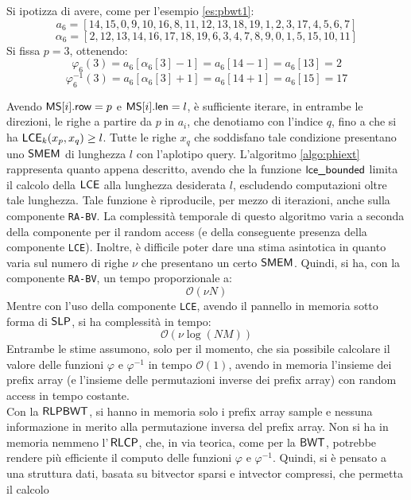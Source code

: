 \begin{esempio}
  Si ipotizza di avere, come per l'esempio \ref{es:pbwt1}:
  \[a_6=[14,15,0,9,10,16,8,11,12,13,18,19,1,2,3,17,4,5,6,7]\]
  \[\alpha_6=[2,12,13,14,16,17,18,19,6,3,4,7,8,9,0,1,5,15,10,11]\]
  Si fissa $p=3$, ottenendo:
  \[\varphi_6(3)=a_6[\alpha_6[3]-1]=a_6[14-1]=a_6[13]=2\]
  \[\varphi^{-1}_6(3)=a_6[\alpha_6[3]+1]=a_6[14+1]=a_6[15]=17\]
\end{esempio}
Avendo $\mbox{\rm {\sf MS}}[i].\mbox{\rm {\sf row}}=p$ e $\mbox{\rm {\sf MS}}[i].\mbox{\rm {\sf len}}=l$, è sufficiente iterare, in entrambe le
direzioni, le righe a
partire da 
$p$ in $a_i$, che denotiamo con l'indice $q$, fino a che si ha 
$\mbox{\rm {\sf LCE}}_k(x_p, x_q)\geq l$.
Tutte le righe $x_q$ che soddisfano tale condizione presentano uno
$\mbox{\rm {\sf SMEM}}$ di lunghezza $l$ con 
l'aplotipo query. L'algoritmo \ref{algo:phiext} rappresenta quanto
appena descritto, avendo che la funzione $\mbox{\rm {\sf lce\_bounded}}$ limita il calcolo
della 
$\mbox{\rm {\sf LCE}}$ alla lunghezza desiderata $l$, escludendo computazioni oltre tale
lunghezza. Tale funzione è riproducile, per mezzo di iterazioni, anche sulla
componente \texttt{RA-BV}. La complessità temporale di questo algoritmo
varia a seconda della componente per il random access (e della conseguente
presenza della 
componente \texttt{LCE}). Inoltre, è difficile poter dare una stima asintotica
in quanto varia sul numero di righe $\nu$ che presentano un certo
$\mbox{\rm {\sf SMEM}}$. Quindi, si ha, con la 
componente \texttt{RA-BV}, un tempo proporzionale a:
\begin{equation}
  \label{eq:phiaccbv}
  \mathcal{O}(\nu N)
\end{equation}
Mentre con l'uso della componente \texttt{LCE}, avendo il pannello in memoria
sotto forma di $\mbox{\rm {\sf SLP}}$, si ha complessità in tempo:
\begin{equation}
  \label{eq:phiaccbv2}
  \mathcal{O}(\nu\log (NM))
\end{equation}
Entrambe le stime assumono, solo per il momento, che sia possibile calcolare il
valore delle funzioni $\varphi$ e $\varphi^{-1}$ in tempo $\mathcal{O}(1)$,
avendo in 
memoria l'insieme dei prefix array (e l'insieme delle permutazioni inverse dei
prefix array) con random access in tempo costante.\\
\noindent
Con la $\mbox{\rm {\sf RLPBWT}}$,
si hanno in memoria solo i prefix array sample e nessuna informazione in merito
alla permutazione inversa del 
prefix array. Non si ha in memoria nemmeno l'$\,\mbox{\rm {\sf RLCP}}$, che, in via teorica,
come per la $\mbox{\rm {\sf BWT}}$, potrebbe rendere più efficiente il computo delle funzioni
$\varphi$ 
e $\varphi^{-1}$. Quindi, si è pensato a una struttura dati, basata
su bitvector sparsi e intvector compressi, che permetta il calcolo
